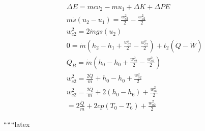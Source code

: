 \begin{align*}
    &\Delta E = m c v_2 - m u_1 + \Delta K + \Delta P E \\
    &m \dot{s} (u_2 - u_1) = \frac{w_{c2}^2}{2} - \frac{w_{o2}^2}{2} \\
    &w_{c2}^2 = 2 \dot{m} g s (u_2) \\
    &0 = \dot{m} (h_2 - h_1 + \frac{w_{o2}^2}{2} - \frac{w_{c2}^2}{2}) + t_2 (\dot{Q} - \dot{W}) \\
    &Q_B = \dot{m} (h_0 - h_0 + \frac{w_{c2}^2}{2} - \frac{w_{o2}^2}{2}) \\
    &w_{c2}^2 = \frac{2 \dot{Q}}{m} + h_0 - h_0 + \frac{w_{o2}^2}{2} \\
    &w_{c2}^2 = \frac{2 \dot{Q}}{m} + 2 (h_0 - h_6) + \frac{w_{o2}^2}{2} \\
    &= 2 \frac{\dot{Q}}{m} + 2 cp (T_0 - T_6) + \frac{w_{o2}^2}{2}
\end{align*}

``````latex